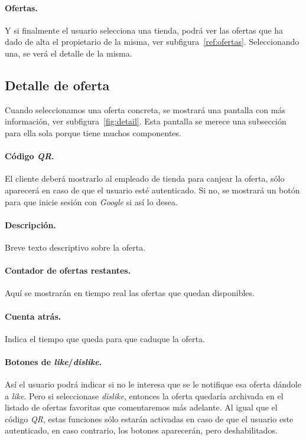 \paragraph{Ofertas.} Y si finalmente el usuario selecciona una tienda, podrá ver las ofertas que ha dado de alta el propietario de la misma, ver subfigura~\ref{ref:ofertas}. Seleccionando una, se verá el detalle de la misma.

\subsection{Detalle de oferta}
Cuando seleccionamos una oferta concreta, se mostrará una pantalla con más información, ver subfigura~\ref{fig:detail}. Esta pantalla se merece una subsección para ella sola porque tiene muchos componentes.

\paragraph{Código \textit{QR}.} El cliente deberá mostrarlo al empleado de tienda para canjear la oferta, sólo aparecerá en caso de que el usuario esté autenticado. Si no, se mostrará un botón para que inicie sesión con \textit{Google} si así lo desea.

\paragraph{Descripción.} Breve texto descriptivo sobre la oferta.

\paragraph{Contador de ofertas restantes.} Aquí se mostrarán en tiempo real las ofertas que quedan disponibles.

\paragraph{Cuenta atrás.} Indica el tiempo que queda para que caduque la oferta.

\paragraph{Botones de \textit{like}/\textit{dislike}.} Así el usuario podrá indicar si no le interesa que se le notifique esa oferta dándole a \textit{like}. Pero si seleccionase \textit{dislike}, entonces la oferta quedaría archivada en el listado de ofertas favoritas que comentaremos más adelante. Al igual que el código \textit{QR}, estas funciones sólo estarán activadas en caso de que el usuario este autenticado, en caso contrario, los botones aparecerán, pero deshabilitados.

